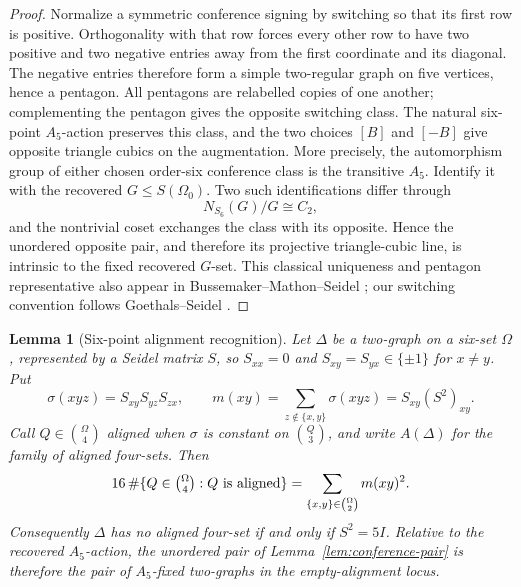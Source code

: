 \documentclass[11pt]{article}
\newtheorem{lemma}[theorem]{Lemma}
\theoremstyle{definition}
\theoremstyle{remark}
\begin{document}
\begin{proof}
Normalize a symmetric conference signing by switching so that its first row
is positive.  Orthogonality with that row forces every other row to have two
positive and two negative entries away from the first coordinate and its
diagonal.  The negative entries therefore form a simple two-regular graph on
five vertices, hence a pentagon.  All pentagons are relabelled copies of one
another; complementing the pentagon gives the opposite switching class.
The natural six-point \(A_5\)-action preserves this class, and the two
choices \([B]\) and \([-B]\) give opposite triangle cubics on the augmentation.
More precisely, the automorphism group of either chosen order-six conference class
is the transitive \(A_5\).  Identify it with the recovered
\(G\leq S(\Omega_0)\).  Two such identifications differ through
\[
 N_{S_6}(G)/G\cong C_2,
\]
and the nontrivial coset exchanges the class with its opposite.  Hence the
unordered opposite pair, and therefore its projective triangle-cubic line,
is intrinsic to the fixed recovered \(G\)-set.  This classical uniqueness
and pentagon representative also appear in
Bussemaker--Mathon--Seidel
\cite[pp.~12, 21, and Table~9 on p.~83]{BMS1979}; our switching
convention follows Goethals--Seidel \cite[\S\S1--3]{GoethalsSeidel1967}.
\end{proof}

\begin{lemma}[Six-point alignment recognition]
\label{lem:six-point-alignment-recognition}
Let \(\Delta\) be a two-graph on a six-set \(\Omega\), represented by a
Seidel matrix \(S\), so \(S_{xx}=0\) and
\(S_{xy}=S_{yx}\in\{\pm1\}\) for \(x\ne y\).  Put
\[
 \sigma(xyz)=S_{xy}S_{yz}S_{zx},\qquad
 m(xy)=\sum_{z\notin\{x,y\}}\sigma(xyz)
      =S_{xy}(S^2)_{xy}.
\]
Call \(Q\in\binom{\Omega}{4}\) aligned when \(\sigma\) is constant on
\(\binom Q3\), and write \(A(\Delta)\) for the family of aligned four-sets.
Then
\[
 16\,\#\{Q\in\tbinom{\Omega}{4}:Q\text{ is aligned}\}
    =\sum_{\{x,y\}\in\binom{\Omega}{2}}m(xy)^2.
\]
Consequently \(\Delta\) has no aligned four-set if and only if
\(S^2=5I\).  Relative to the recovered \(A_5\)-action, the unordered pair
of Lemma~\ref{lem:conference-pair} is therefore the pair of
\(A_5\)-fixed two-graphs in the empty-alignment locus.
\end{lemma}
\end{document}
